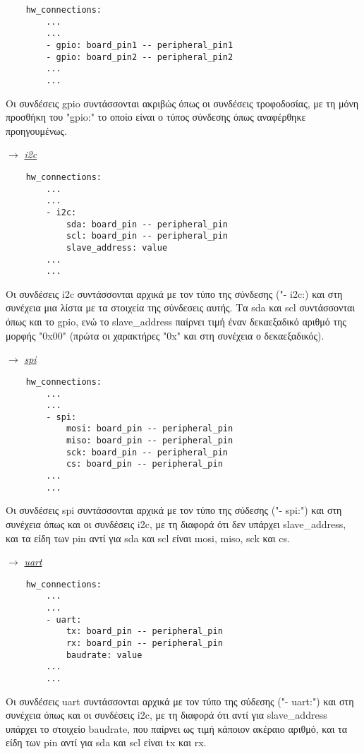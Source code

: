 \begin{lstlisting}
	hw_connections:
		...
		...
		- gpio: board_pin1 -- peripheral_pin1
		- gpio: board_pin2 -- peripheral_pin2
		...
		...
\end{lstlisting}

Οι συνδέσεις gpio συντάσσονται ακριβώς όπως οι συνδέσεις τροφοδοσίας, με τη μόνη προσθήκη του "gpio:" το οποίο είναι ο τύπος σύνδεσης όπως αναφέρθηκε προηγουμένως.

$\rightarrow$ \underline{\textit{i2c}}

\begin{lstlisting}
	hw_connections:
		...
		...
		- i2c: 
			sda: board_pin -- peripheral_pin
			scl: board_pin -- peripheral_pin
			slave_address: value
		...
		...
\end{lstlisting}

Οι συνδέσεις i2c συντάσσονται αρχικά με τον τύπο της σύνδεσης ("- i2c:) και στη συνέχεια μια λίστα με τα στοιχεία της σύνδεσεις αυτής. Τα sda και scl συντάσσονται όπως και το gpio, ενώ το slave\_address παίρνει τιμή έναν δεκαεξαδικό αριθμό της μορφής "0x00" (πρώτα οι χαρακτήρες "0x" και στη συνέχεια ο δεκαεξαδικός).

$\rightarrow$ \underline{\textit{spi}}

\begin{lstlisting}
	hw_connections:
		...
		...
		- spi: 
			mosi: board_pin -- peripheral_pin
			miso: board_pin -- peripheral_pin
			sck: board_pin -- peripheral_pin
			cs: board_pin -- peripheral_pin
		...
		...
\end{lstlisting}

Οι συνδέσεις spi συντάσσονται αρχικά με τον τύπο της σύδεσης ("- spi:") και στη συνέχεια όπως και οι συνδέσεις i2c, με τη διαφορά ότι δεν υπάρχει slave\_address, και τα είδη των pin αντί για sda και scl είναι mosi, miso, sck και cs.

$\rightarrow$ \underline{\textit{uart}}

\begin{lstlisting}
	hw_connections:
		...
		...
		- uart: 
			tx: board_pin -- peripheral_pin
			rx: board_pin -- peripheral_pin
			baudrate: value
		...
		...
\end{lstlisting}

Οι συνδέσεις uart συντάσσονται αρχικά με τον τύπο της σύδεσης ("- uart:") και στη συνέχεια όπως και οι συνδέσεις i2c, με τη διαφορά ότι αντί για slave\_address υπάρχει το στοιχείο baudrate, που παίρνει ως τιμή κάποιον ακέραιο αριθμό, και τα είδη των pin αντί για sda και scl είναι tx και rx.

